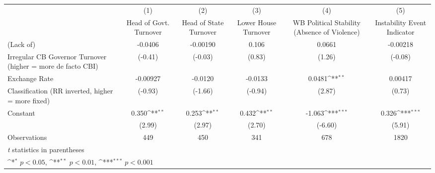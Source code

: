 {
\def\sym#1{\ifmmode^{#1}\else\(^{#1}\)\fi}
\begin{tabular}{l*{5}{c}}
\toprule
                &\multicolumn{1}{c}{(1)}&\multicolumn{1}{c}{(2)}&\multicolumn{1}{c}{(3)}&\multicolumn{1}{c}{(4)}&\multicolumn{1}{c}{(5)}\\
                &\multicolumn{1}{c}{Head of Govt. Turnover}&\multicolumn{1}{c}{Head of State Turnover}&\multicolumn{1}{c}{Lower House Turnover}&\multicolumn{1}{c}{WB Political Stability (Absence of Violence)}&\multicolumn{1}{c}{Instability Event Indicator}\\
\midrule
(Lack of)       &  -0.0406         & -0.00190         &    0.106         &   0.0661         & -0.00218         \\
Irregular CB Governor Turnover (higher = more de facto CBI)&  (-0.41)         &  (-0.03)         &   (0.83)         &   (1.26)         &  (-0.08)         \\
\addlinespace
Exchange Rate   & -0.00927         &  -0.0120         &  -0.0133         &   0.0481\sym{**} &  0.00417         \\
Classification (RR inverted, higher = more fixed)&  (-0.93)         &  (-1.66)         &  (-0.94)         &   (2.87)         &   (0.73)         \\
\addlinespace
Constant        &    0.350\sym{**} &    0.253\sym{**} &    0.432\sym{**} &   -1.063\sym{***}&    0.326\sym{***}\\
                &   (2.99)         &   (2.97)         &   (2.70)         &  (-6.60)         &   (5.91)         \\
\midrule
Observations    &      449         &      450         &      341         &      678         &     1820         \\
\bottomrule
\multicolumn{6}{l}{\footnotesize \textit{t} statistics in parentheses}\\
\multicolumn{6}{l}{\footnotesize \sym{*} \(p<0.05\), \sym{**} \(p<0.01\), \sym{***} \(p<0.001\)}\\
\end{tabular}
}

